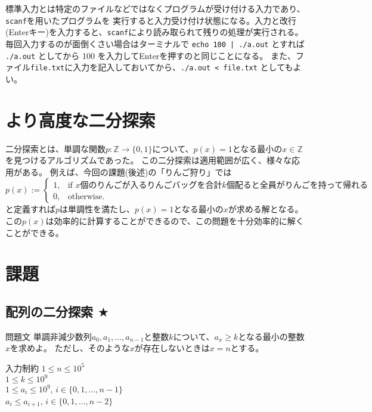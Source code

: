 \documentclass[a4paper,twoside,onecolumn,openany,article,10pt]{memoir}
\theoremstyle{remark}
\begin{document}
標準入力とは特定のファイルなどではなくプログラムが受け付ける入力であり、\texttt{scanf}を用いたプログラムを
実行すると入力受け付け状態になる。入力と改行(Enterキー)を入力すると、\texttt{scanf}により読み取られて残りの処理が実行される。
毎回入力するのが面倒くさい場合はターミナルで \texttt{echo 100 | ./a.out} とすれば \texttt{./a.out} としてから 100 を入力してEnterを押すのと同じことになる。
また、ファイル\texttt{file.txt}に入力を記入しておいてから、\texttt{./a.out < file.txt} としてもよい。

\section{より高度な二分探索}
二分探索とは、単調な関数$p\colon \mathbb{Z}\to\{0,1\}$について、$p(x)=1$となる最小の$x\in\mathbb{Z}$を見つけるアルゴリズムであった。
この二分探索は適用範囲が広く、様々な応用がある。
例えば、今回の課題(後述)の「りんご狩り」では
\begin{equation*}
p(x) := \begin{cases}
1,& \text{if $x$個のりんごが入るりんごバッグを合計$k$個配ると全員がりんごを持って帰れる}\\
0,& \text{otherwise.}
\end{cases}
\end{equation*}
と定義すれば$p$は単調性を満たし、$p(x)=1$となる最小の$x$が求める解となる。
この$p(x)$は効率的に計算することができるので、この問題を十分効率的に解くことができる。



\clearpage
\section{課題}\label{sec:assign}
\subsection{配列の二分探索 $\bigstar$}
\begin{itembox}[l]{問題文}
単調非減少数列$a_0, a_1,\dotsc, a_{n-1}$と整数$k$について、$a_x\ge k$となる最小の整数$x$を求めよ。
ただし、そのような$x$が存在しないときは$x=n$とする。
\end{itembox}

\begin{itembox}[l]{入力制約}
$1\le n\le 10^5$\\
$1\le k\le 10^9$\\
$1\le a_i\le 10^9$,\hspace{2em} $i\in\{0,1,\dotsc,n-1\}$\\
$a_i\le a_{i+1}$,\hspace{2em} $i\in\{0,1,\dotsc,n-2\}$
\end{itembox}
\end{document}
